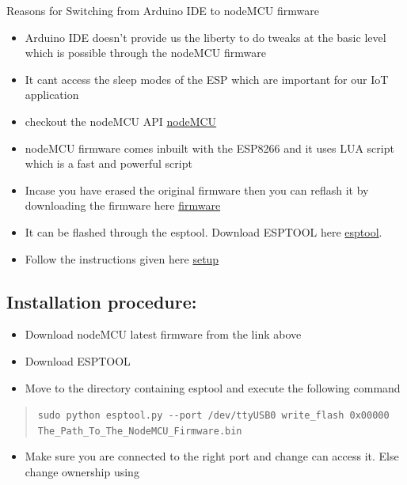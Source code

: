 \documentclass[16pt]{article}
\begin{document}
Reasons for Switching from Arduino IDE to nodeMCU firmware

\begin{itemize}

\item
  Arduino IDE doesn't provide us the liberty to do tweaks at the basic
  level which is possible through the nodeMCU firmware
\item
  It cant access the sleep modes of the ESP which are important for our
  IoT application
\item
  checkout the nodeMCU API
  \href{https://github.com/nodemcu/nodemcu-firmware/wiki/nodemcu_api_en}{nodeMCU}
\item
  nodeMCU firmware comes inbuilt with the ESP8266 and it uses LUA script
  which is a fast and powerful script
\item
  Incase you have erased the original firmware then you can reflash it
  by downloading the firmware here
  \href{https://github.com/nodemcu/nodemcu-firmware/raw/master/pre_build/latest/nodemcu_latest.bin}{firmware}
\item
  It can be flashed through the esptool. Download ESPTOOL here
  \href{https://github.com/themadinventor/esptool/}{esptool}.
\item
  Follow the instructions given here
  \href{http://www.whatimade.today/flashing-the-nodemcu-firmware-on-the-esp8266-linux-guide/}{setup}
 
\end{itemize}

\subsection{Installation procedure:}

\begin{itemize}

\item
  Download nodeMCU latest firmware from the link above 
\item
  Download ESPTOOL
\item
  Move to the directory containing esptool and execute the following
  command
\end{itemize}

\begin{quote}
\texttt{sudo python esptool.py -{}-port /dev/ttyUSB0  write\_flash 0x00000 The\_Path\_To\_The\_NodeMCU\_Firmware.bin}
\end{quote}

\begin{itemize}

\item
  Make sure you are connected to the right port and change can access
  it. Else change ownership using
\end{itemize}
\end{document}
